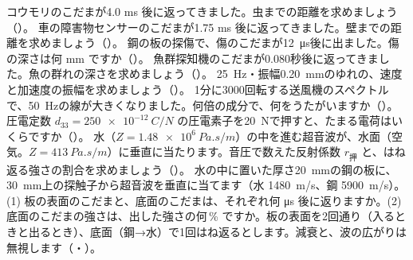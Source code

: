 \bkendproblems
{}
\bkproblem コウモリのこだまが4.0 ms 後に返ってきました。虫までの距離を求めましょう（\nobreak{}\nobreak）。
\bkproblem 車の障害物センサーのこだまが1.75 ms 後に返ってきました。壁までの距離を求めましょう（\nobreak{}\nobreak）。
\bkproblem 鋼の板の探傷で、傷のこだまが\qty{12}{\micro s}後に出ました。傷の深さは何 mm ですか（\nobreak{}\nobreak）。
\bkproblem 魚群探知機のこだまが0.080秒後に返ってきました。魚の群れの深さを求めましょう（\nobreak{}\nobreak）。
\bkproblem \qty{25}{Hz}・振幅\qty{0.20}{mm}のゆれの、速度と加速度の振幅を求めましょう（\nobreak{}\nobreak）。
\bkproblem 1分に\num{3000}回転する送風機のスペクトルで、\qty{50}{Hz}の線が大きくなりました。何倍の成分で、何をうたがいますか（\nobreak{}\nobreak）。
\bkproblem 圧電定数 $d_{33}=\qty{250e-12}{C/N}$ の圧電素子を\qty{20}{N}で押すと、たまる電荷はいくらですか（\nobreak{}\nobreak）。
\bkproblem 水（$Z=\qty{1.48e6}{Pa.s/m}$）の中を進む超音波が、水面（空気。$Z=\qty{413}{Pa.s/m}$）に垂直に当たります。音圧で数えた反射係数 $r_{\text{押}}$ と、はね返る強さの割合を求めましょう（\nobreak{}\nobreak）。
\bkproblem 水の中に置いた厚さ\qty{20}{mm}の鋼の板に、\qty{30}{mm}上の探触子から超音波を垂直に当てます（水 \qty{1480}{m/s}、鋼 \qty{5900}{m/s}）。(1) 板の表面のこだまと、底面のこだまは、それぞれ何 \si{\micro s} 後に返りますか。(2) 底面のこだまの強さは、出した強さの何\,\% ですか。板の表面を2回通り（入るときと出るとき）、底面（鋼→水）で1回はね返るとします。減衰と、波の広がりは無視します（\nobreak{}・\nobreak）。
